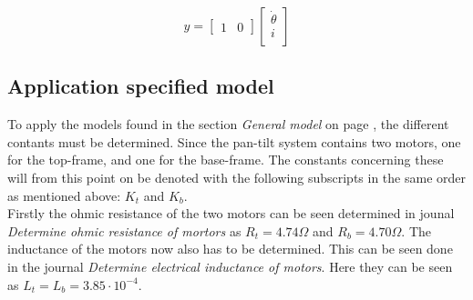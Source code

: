 \documentclass[../../main]{subfiles}
\begin{document}
\begin{equation}
      \label{equ:model_ss_2}
      y =
    \begin{bmatrix}
        1 & 0
    \end{bmatrix}
    \begin{bmatrix}
        \dot \theta\\
        i\\
    \end{bmatrix}
\end{equation}

\subsection{Application specified model}

To apply the models found in the section \textit{General model} on page \pageref{sec:General_model}, the different contants must be determined. Since the pan-tilt system contains two motors, one for the top-frame, and one for the base-frame. The constants concerning these will from this point on be denoted with the following subscripts in the same order as mentioned above: $K_t$ and $K_b$.\\
Firstly the ohmic resistance of the two motors can be seen determined in jounal \textit{Determine ohmic resistance of mortors} as $R_t = 4.74 \Omega$ and $R_b = 4.70 \Omega$. The inductance of the motors now also has to be determined. This can be seen done in the journal \textit{Determine electrical inductance of motors}. Here they can be seen as $L_t = L_b = 3.85\cdot 10^{-4}$.
\end{document}
